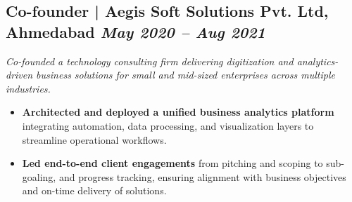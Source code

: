 \documentclass[10pt,a4paper]{article}
\begin{document}
\subsection{Co-founder | Aegis Soft Solutions Pvt. Ltd, Ahmedabad \hfill
\textit{May 2020 -- Aug 2021}}
\textit{Co-founded a technology consulting firm delivering digitization and analytics-driven business solutions for small and mid-sized enterprises across multiple industries.}
\begin{itemize}
    \item \textbf{Architected and deployed a unified business analytics platform} integrating automation, data processing, and visualization layers to streamline operational workflows.
    \item \textbf{Led end-to-end client engagements} from pitching and scoping to sub-goaling, and progress tracking, ensuring alignment with business objectives and on-time delivery of solutions.
\end{itemize}


\end{document}
